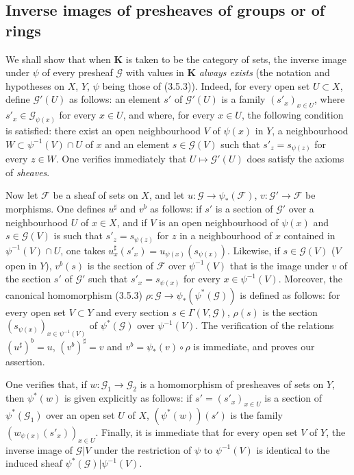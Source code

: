 \subsection{Inverse images of presheaves of groups or of rings}


\begin{env}[3.7.1]
\label{0.3.7.1}
We shall show that when $\mathbf{K}$ is taken to be the category of
sets, the inverse image under $\psi$ of every presheaf $\mathcal{G}$ with
values in $\mathbf{K}$ \emph{always exists} (the notation and hypotheses
on $X$, $Y$, $\psi$ being those of (3.5.3)). Indeed, for every open set
$U\subset X$, define $\mathcal{G}'(U)$ as follows: an element $s'$ of
$\mathcal{G}'(U)$ is a family $(s'_x)_{x\in U}$, where
$s'_x\in\mathcal{G}_{\psi(x)}$ for every $x\in U$, and where, for every $x\in U$,
the following condition is satisfied: there exist an open neighbourhood $V$ of
$\psi(x)$ in $Y$, a neighbourhood $W\subset\psi^{-1}(V)\cap U$ of $x$ and an
element $s\in\mathcal{G}(V)$ such that $s'_z=s_{\psi(z)}$ for every $z\in W$.
One verifies immediately that $U\mapsto\mathcal{G}'(U)$ does satisfy the
axioms of \emph{sheaves}.

Now let $\mathcal{F}$ be a sheaf of sets on $X$, and let
$u:\mathcal{G}\to\psi_*(\mathcal{F})$,
$v:\mathcal{G}'\to\mathcal{F}$ be morphisms. One defines $u^\sharp$ and $v^b$
as follows: if $s'$ is a section of $\mathcal{G}'$ over
a neighbourhood $U$ of $x\in X$, and if $V$ is an open neighbourhood of $\psi(x)$
and $s\in\mathcal{G}(V)$ is such that $s'_z=s_{\psi(z)}$ for $z$ in a
neighbourhood of $x$ contained in $\psi^{-1}(V)\cap U$, one takes
$u_x^\sharp(s'_x)=u_{\psi(x)}(s_{\psi(x)})$. Likewise, if
$s\in\mathcal{G}(V)$ ($V$ open in $Y$), $v^b(s)$ is the section of
$\mathcal{F}$ over $\psi^{-1}(V)$ that is the image under $v$ of the section $s'$ of
$\mathcal{G}'$ such that $s'_x=s_{\psi(x)}$ for every
$x\in\psi^{-1}(V)$. Moreover, the canonical homomorphism (3.5.3)
$\rho:\mathcal{G}\to\psi_*(\psi^*(\mathcal{G}))$ is defined as
follows: for every open set $V\subset Y$ and every section
$s\in\Gamma(V,\mathcal{G})$, $\rho(s)$ is the section
$(s_{\psi(x)})_{x\in\psi^{-1}(V)}$ of $\psi^*(\mathcal{G})$ over
$\psi^{-1}(V)$. The verification of the relations
$(u^\sharp)^b=u$, $(v^b)^\sharp=v$ and
$v^b=\psi_*(v)\circ\rho$ is immediate, and proves our assertion.

One verifies that, if $w:\mathcal{G}_1\to\mathcal{G}_2$ is a homomorphism of
presheaves of sets on $Y$, then $\psi^*(w)$ is given explicitly as
follows: if $s'=(s'_x)_{x\in U}$ is a section of
$\psi^*(\mathcal{G}_1)$ over an open set $U$ of $X$,
$(\psi^*(w))(s')$ is the family
$(w_{\psi(x)}(s'_x))_{x\in U}$. Finally, it is immediate that for every open set
$V$ of $Y$, the inverse image of $\mathcal{G}|V$ under the restriction of
$\psi$ to $\psi^{-1}(V)$ is identical to the induced sheaf
$\psi^*(\mathcal{G})|\psi^{-1}(V)$.


\end{env}

